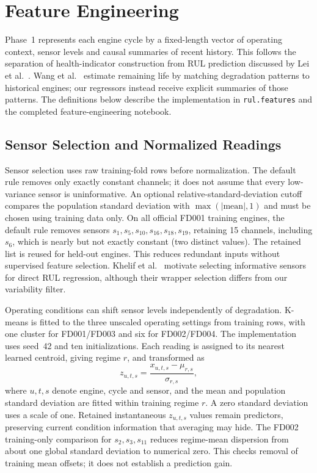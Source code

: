 
\section{Feature Engineering}
\label{sec:feature_engineering}

Phase~1 represents each engine cycle by a fixed-length vector of operating
context, sensor levels and causal summaries of recent history. This follows the
separation of health-indicator construction from RUL prediction discussed by
Lei et al.~\cite{Lei2018machinery}. Wang et al.~\cite{Wang2008similarity}
estimate remaining life by matching degradation patterns to historical engines;
our regressors instead receive explicit summaries of those patterns. The
definitions below describe the implementation in \texttt{rul.features} and the
completed feature-engineering notebook.

\subsection{Sensor Selection and Normalized Readings}
Sensor selection uses raw training-fold rows before normalization. The default
rule removes only exactly constant channels; it does not assume that every
low-variance sensor is uninformative. An optional relative-standard-deviation
cutoff compares the population standard deviation with
$\max(|\mathrm{mean}|,1)$ and must be chosen using training data only. On all
official FD001 training engines, the default rule removes sensors
$s_1,s_5,s_{10},s_{16},s_{18},s_{19}$, retaining 15 channels, including
$s_6$, which is nearly but not exactly constant (two distinct values). The
retained list is reused for held-out engines. This reduces
redundant inputs without supervised feature selection. Khelif
et al.~\cite{Khelif2017direct} motivate selecting informative sensors for direct
RUL regression, although their wrapper selection differs from our variability
filter.

Operating conditions can shift sensor levels independently of degradation.
K-means is fitted to the three unscaled operating settings from training rows,
with one cluster for FD001/FD003 and six for FD002/FD004. The implementation
uses seed~42 and ten initializations. Each reading is assigned to its nearest
learned centroid, giving regime $r$, and transformed as
\begin{equation}
    z_{u,t,s}=\frac{x_{u,t,s}-\mu_{r,s}}{\sigma_{r,s}},
\end{equation}
where $u,t,s$ denote engine, cycle and sensor, and the mean and population
standard deviation are fitted within training regime $r$. A zero standard
deviation uses a scale of one. Retained instantaneous $z_{u,t,s}$ values remain
predictors, preserving current condition information that averaging may hide.
The FD002 training-only comparison for $s_2,s_3,s_{11}$ reduces regime-mean
dispersion from about one global standard deviation to numerical zero. This
checks removal of training mean offsets; it does not establish a prediction
gain.


